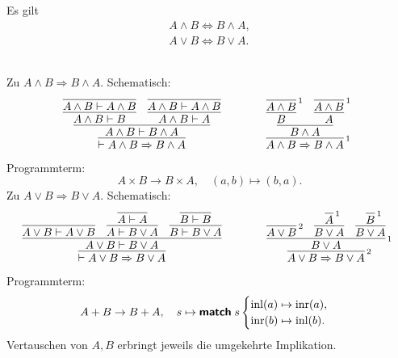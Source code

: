 \begin{Satz}%
\label{bool-cl}
Es gilt
\begin{gather*}
A\land B \iff B\land A,\\
A\lor B \iff B\lor A.
\end{gather*}
\end{Satz}
\begin{Beweis}\\
Zu $A\land B\Rightarrow B\land A$. Schematisch:
\[
\begin{array}{@{}l@{\qquad\qquad}l}
\infer{\vdash A\land B\Rightarrow B\land A}{
  \infer{A\land B\vdash B\land A}{
    \infer{A\land B\vdash B}{
      \infer{A\land B\vdash A\land B}{}}
    & \infer{A\land B\vdash A}{
      \infer{A\land B\vdash A\land B}{}}}}
&
\infer[\infernote{1}]{A\land B\Rightarrow B\land A}{
  \infer{B\land A}{
     \infer{B}{\infer[\infernote{1}]{A\land B}{}}
     & \infer{A}{\infer[\infernote{1}]{A\land B}{}}}}
\end{array}
\]
Programmterm:
\[A\times B\to B\times A,\quad (a,b)\mapsto (b,a).\]
Zu $A\lor B\Rightarrow B\lor A$. Schematisch:
\[
\begin{array}{@{}l@{\qquad\qquad}l}
\infer{\vdash A\lor B\Rightarrow B\lor A}{
  \infer{A\lor B\vdash B\lor A}{
    \infer{A\lor B\vdash A\lor B}{}
    & \infer{A\vdash B\lor A}{
        \infer{A\vdash A}{}}
    & \infer{B\vdash B\lor A}{
        \infer{B\vdash B}{}}}}
&
\infer[\infernote{2}]{A\lor B\Rightarrow B\lor A}{
  \infer[\infernote{1}]{B\lor A}{
    \infer[\infernote{2}]{A\lor B}{}
    & \infer{B\lor A}{\infer[\infernote{1}]{A}{}}
    & \infer{B\lor A}{\infer[\infernote{1}]{B}{}}}}
\end{array}
\]
Programmterm:
\[A+B\to B+A,\quad s\mapsto\text{{\normalfont\sffamily\bfseries match}}\; s\begin{cases}
\operatorname{inl}(a)\mapsto \operatorname{inr}(a),\\
\operatorname{inr}(b)\mapsto \operatorname{inl}(b).
\end{cases}\]
Vertauschen von $A,B$ erbringt jeweils die umgekehrte Implikation.\;\qedsymbol
\end{Beweis}

